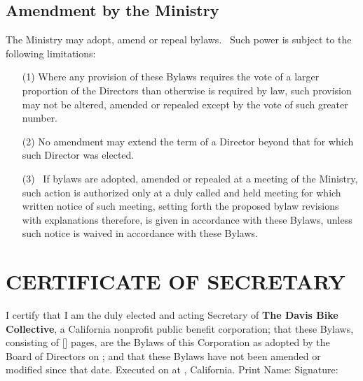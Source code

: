 \documentclass[letterpaper,titlepage]{article}
\begin{document}
\subsection{Amendment by the Ministry}
\label{sec:amendementMinistry}
The Ministry may adopt, amend or repeal bylaws.  Such power is subject to the following limitations:
\begin{itemize}
    \item[(1)] Where any provision of these Bylaws requires the vote of a larger proportion of the Directors than otherwise is required by law, such provision may not be altered, amended or repealed except by the vote of such greater number.
    \item[(2)] No amendment may extend the term of a Director beyond that for which such Director was elected.
    \item[(3)] If bylaws are adopted, amended or repealed at a meeting of the Ministry, such action is authorized only at a duly called and held meeting for which written notice of such meeting, setting forth the proposed bylaw revisions with explanations therefore, is given in accordance with these Bylaws, unless such notice is waived in accordance with these Bylaws.
\end{itemize}
\newpage
\section{CERTIFICATE OF SECRETARY}
I certify that I am the duly elected and acting Secretary of {\bf The Davis Bike
Collective}, a California nonprofit public benefit corporation; that these
Bylaws, consisting of [\pageref{LastPage}] pages, are the Bylaws of this Corporation as adopted
by the Board of Directors on \underline{\hspace{1.5in}}; and that
these Bylaws have not been amended or modified since that date.
\vskip 0.2in
Executed on \underline{\hspace{1.5in}} at \underline{\hspace{1.5in}},
California.
\vskip 0.2in
Print Name: \underline{\hspace{4in}}
\vskip 0.2in
Signature: \underline{\hspace{4in}}
\end{document}
